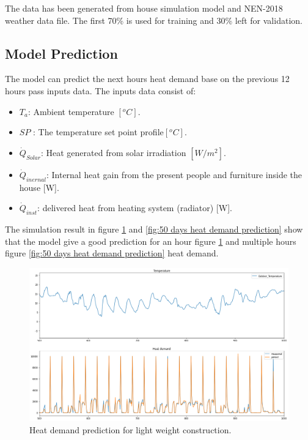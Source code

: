The data has been generated from house simulation model and NEN-2018 weather data file. The first 70\% is used for training and  30\% left for validation.

\subsection{Model Prediction}

The model can predict the next hours heat demand base on the previous 12 hours pass inputs data. The inputs data consist of: 

\begin{itemize}
    \item $T_{a}$: Ambient temperature $[^o C]$.
    \item $SP$   : The temperature set point profile$[^o C]$. 
    \item $\dot{Q}_{Solar}$: Heat generated from solar irradiation $[W/m^2]$.
    \item $\dot{Q}_{inernal}$: Internal heat gain from the present people and furniture inside the house [W].
    \item $\dot{Q}_{inst}$: delivered heat from heating system (radiator) [W].
\end{itemize}

The simulation result in figure \ref{fig:heat demand prediction} and \ref{fig:50 days heat demand prediction} show that the model give a good prediction for an hour figure \ref{fig:heat demand prediction} and multiple hours figure \ref{fig:50 days heat demand prediction} heat demand.

\begin{figure}[H]
	\centering
	\includegraphics[width=1.0\columnwidth]{Pictures/house heat demand prediction zoom.png}
	\caption[Short title]{Heat demand prediction for light weight construction.}
	\label{fig:heat demand prediction}
	\end{figure}

